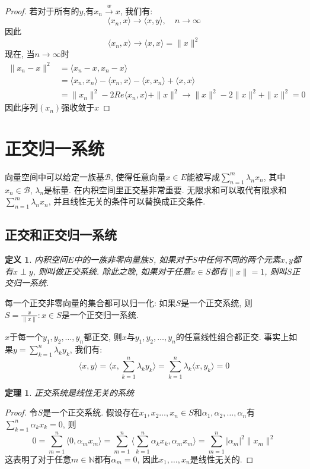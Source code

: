 \documentclass{book}
\newtheorem{definition}{\hspace{2em}定义}[section]
\newtheorem{theorem}{\hspace{2em}定理}[section]
\newtheorem{proof}{证明}[section]
\begin{document}
\begin{proof}
  若对于所有的$y$,有$x_n\stackrel{w}{\to}x$, 我们有:
  \begin{equation*}
    \langle x_n,x\rangle\to\langle x,y\rangle,\quad n\to\infty
  \end{equation*}
  因此
  \begin{equation*}
    \langle x_n,x\rangle\to\langle x,x\rangle=\|x\|^2
  \end{equation*}
  现在, 当$n\to\infty$时
  \begin{equation*}
    \begin{split}
       \|x_n-x\|^2 & =\langle x_n-x,x_n-x\rangle \\
         & =\langle x_n,x_n\rangle-\langle x_n,x\rangle-\langle x,x_n\rangle+\langle x,x\rangle \\
         & =\|x_n\|^2-2Re\langle x_n,x\rangle+\|x\|^2\to\|x\|^2-2\|x\|^2+\|x\|^2=0
    \end{split}
  \end{equation*}
  因此序列$(x_n)$强收敛于$x$
\end{proof}
\section{正交归一系统}
向量空间中可以给定一族基$\mathcal{B}$, 使得任意向量$x\in E$能被写成$\sum_{n=1}^{m}\lambda_nx_n$, 其中$x_n\in \mathcal{B}$, $\lambda_n$是标量. 在内积空间里正交基非常重要. 无限求和可以取代有限求和$\sum_{n=1}^{m}\lambda_nx_n$, 并且线性无关的条件可以替换成正交条件.
\subsection*{正交和正交归一系统}
\begin{definition}
  内积空间$E$中的一族非零向量族$S$, 如果对于$S$中任何不同的两个元素$x,y$都有$x\perp y$, 则叫做正交系统. 除此之晚, 如果对于任意$x\in S$都有$\|x\|=1$, 则叫$S$正交归一系统.
\end{definition}
每一个正交非零向量的集合都可以归一化: 如果$S$是一个正交系统, 则$S={\frac{x}{\|x\|}:x\in S}$是一个正交归一系统.

$x$于每一个$y_1,y_2,\dots,y_n$都正交, 则$x$与$y_1,y_2,\dots,y_n$的任意线性组合都正交. 事实上如果$y=\sum_{k=1}^{n}\lambda_ky_k$, 我们有:
\begin{equation*}
  \langle x,y\rangle=\langle x,\sum_{k=1}^{n}\lambda_ky_k\rangle=\sum_{k=1}^{n}\lambda_k\langle x,y_k\rangle=0
\end{equation*}
\begin{theorem}
  正交系统是线性无关的系统
\end{theorem}
\begin{proof}
  令$S$是一个正交系统. 假设存在$x_1,x_2\dots,x_n\in S$和$\alpha_1,\alpha_2,\dots,\alpha_n$有$\sum_{k=1}^{n}\alpha_kx_k=0$, 则
  \begin{equation*}
    0=\sum_{m=1}^{n}\langle0,\alpha_mx_m\rangle=\sum_{m=1}^{n}\langle\sum_{k=1}^{n}\alpha_kx_k,\alpha_mx_m\rangle=\sum_{m=1}^{n}|\alpha_m|^2\|x_m\|^2
  \end{equation*}
  这表明了对于任意$m\in \mathbb{N}$都有$\alpha_m=0$, 因此$x_1,\dots,x_n$是线性无关的.
\end{proof}
\end{document}
